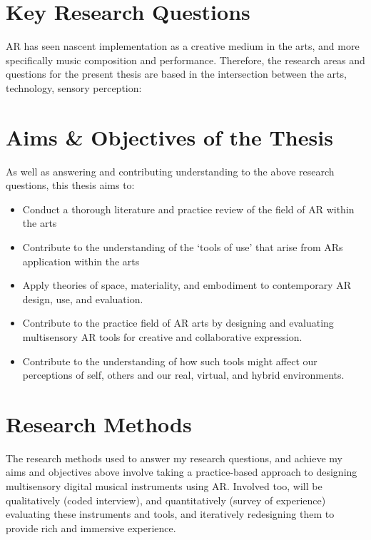 \section{Key Research Questions}\label{sec: introduction-researchquestions}


AR has seen nascent implementation as a creative medium in the arts, and more specifically music composition and performance. Therefore, the research areas and questions for the present thesis are based in the intersection between the arts, technology, sensory perception:

\RQallsub

\section{Aims \& Objectives of the Thesis}\label{sec: introduction-aims}
As well as answering and contributing understanding to the above research questions, this thesis aims to:

\begin{itemize}
    \item Conduct a thorough literature and practice review of the field of AR within the arts
    \item Contribute to the understanding of the `tools of use' that arise from ARs application within the arts
    \item Apply theories of space, materiality, and embodiment to contemporary AR design, use, and evaluation.
    \item Contribute to the practice field of AR arts by designing and evaluating multisensory AR tools for creative and collaborative expression.
    \item Contribute to the understanding of how such tools might affect our perceptions of self, others and our real, virtual, and hybrid environments. 
\end{itemize}



\section{Research Methods}\label{sec: introduction-methods}
The research methods used to answer my research questions, and achieve my aims and objectives above involve taking a practice-based approach to designing multisensory digital musical instruments using AR. Involved too, will be qualitatively (coded interview), and quantitatively (survey of experience) evaluating these instruments and tools, and iteratively redesigning them to provide rich and immersive experience.



